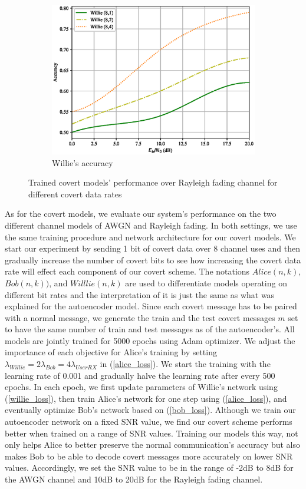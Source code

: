 \begin{figure}[tp!]
\begin{subfigure}{0.3\textwidth}
		\includegraphics[width=\linewidth]{figs/willie_accuracy_rayleigh}
		\caption{Willie's accuracy}
		\label{fig:rayleigh_resutls_willie}
	\end{subfigure}
	\caption{Trained covert models' performance over Rayleigh fading channel for different covert data rates}
	\label{fig:rayleigh_resutls}
\end{figure}
As for the covert models, we evaluate our system's performance on the two different channel models of AWGN and Rayleigh fading. In both settings, we use the same training procedure and network architecture for our covert models. We start our experiment by sending 1 bit of covert data over 8 channel uses and then gradually increase the number of covert bits to see how increasing the covert data rate will effect each component of our covert scheme. The notations \(Alice (n,k)\), \(Bob (n,k))\), and \(Willlie (n,k)\) are used to differentiate models operating on different bit rates and the interpretation of it is just the same as what was explained for the autoencoder model. Since each covert message has to be paired with a normal message, we generate the train and the test covert messages \(m\) set to have the same number of train and test messages as of the autoencoder's. All models are jointly trained for 5000 epochs using Adam optimizer. We adjust the importance of each objective for Alice's training by setting \(\lambda_{Willie} = 2 \lambda_{Bob} = 4 \lambda_{UserRX}\) in (\ref{alice_loss}). We start the training with the learning rate of 0.001 and gradually halve the learning rate after every 500 epochs. In each epoch, we first update parameters of Willie's network using (\ref{willie_loss}), then train Alice's network for one step using (\ref{alice_loss}), and eventually optimize Bob's network based on (\ref{bob_loss}). Although we train our autoencoder network on a fixed SNR value, we find our covert scheme performs better when trained on a range of SNR values. Training our models this way, not only helps Alice to better preserve the normal communication's accuracy but also makes Bob to be able to decode covert messages more accurately on lower SNR values. Accordingly, we set the SNR value to be in the range of -2dB to 8dB for the AWGN channel and 10dB to 20dB for the Rayleigh fading channel.
